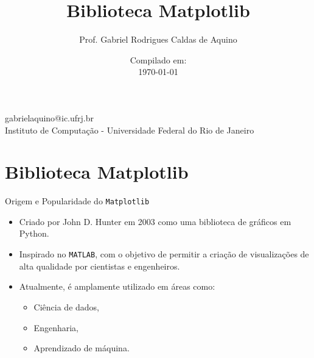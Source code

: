 
\title{Biblioteca Matplotlib}

\author{Prof. Gabriel Rodrigues Caldas de Aquino}

\institute
{
    gabrielaquino@ic.ufrj.br\\
    
    Instituto de Computação -
    Universidade Federal do Rio de Janeiro %
}
\date{Compilado em: \\ \today} %


\section{Biblioteca Matplotlib}

\begin{frame}
    \titlepage
\end{frame}



\begin{frame}{Origem e Popularidade do \texttt{Matplotlib}}
    \begin{itemize}
        \item Criado por John D. Hunter em 2003 como uma biblioteca de gráficos em Python.
        \item Inspirado no \texttt{MATLAB}, com o objetivo de permitir a criação de visualizações de alta qualidade por cientistas e engenheiros.
        \item Atualmente, é amplamente utilizado em áreas como:
        \begin{itemize}
            \item Ciência de dados,
            \item Engenharia,
            \item Aprendizado de máquina.
        \end{itemize}
    \end{itemize}
\end{frame}

